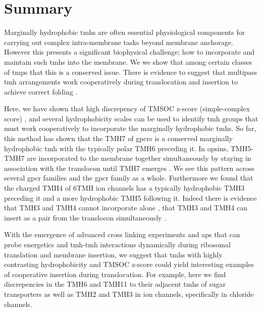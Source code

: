 \section{Summary}

Marginally hydrophobic \gls{tmh}s are often essential physiological components for carrying out complex intra-membrane tasks beyond membrane anchorage.
However this presents a significant biophysical challenge; how to incorporate and maintain such \gls{tmh}s into the membrane.
We we show that among certain classes of \gls{tmp}s that this is a conserved issue.
There is evidence to suggest that multipass \gls{tmh} arrangements work cooperatively during translocation and insertion to achieve correct folding \cite{Ismail2008, Virkki2014, Sadlish2005, Cross2009, Cymer2013, Sato2002, Sato2003, Zhang2007, Cymer2015, Tu2000}.

Here, we have shown that high discrepency of TMSOC z-score (simple-complex score) \cite{Wong2011, Wong2012}, and several hydrophobicity scales \cite{Hessa2005, Kyte1982, White1999, Eisenberg1984} can be used to identify \gls{tmh} groups that must work cooperatively to incorporate the marginally hydrophobic \gls{tmh}s.
So far, this method has shown that the TMH7 of \gls{gpcr}s is a conserved marginally hydrophobic \gls{tmh} with the typically polar TMH6 preceding it.
In opsins, TMH5-TMH7 are incorporated to the membrane together simultaneously by staying in association with the translocon until TMH7 emerges \cite{Ismail2008}.
We see this pattern across several \gls{gpcr} families and the \gls{gpcr} family as a whole.
Furthermore we found that the charged TMH4 of 6TMH ion channels has a typically hydrophobic TMH3 preceding it and a more hydrophobic TMH5 following it.
Indeed there is evidence that TMH3 and TMH4 cannot incorporate alone \cite{Sato2003}, that TMH3 and TMH4 can insert as a pair from the translocon simultaneously \cite{Zhang2007, Cymer2015}.

With the emergence of advanced cross linking experiments and \gls{ap}s that can probe energetics and \gls{tmh}\--\gls{tmh} interactions dynamically during ribosomal translation and membrane insertion, we suggest that \gls{tmh}s with highly contrasting hydrophobicity and TMSOC z-score could yield interesting examples of cooperative insertion during translocation.
For example, here we find discrepencies in the TMH6 and TMH11 to their adjacent \gls{tmh}s of sugar transporters as well as TMH2 and TMH3 in ion channels, specifically in chloride channels.

